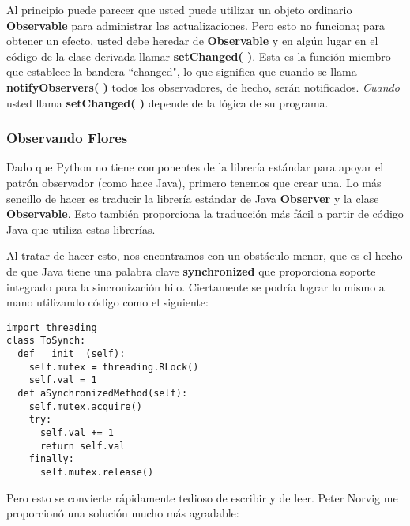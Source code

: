 Al principio puede parecer que usted puede utilizar un objeto ordinario \textbf{Observable} para administrar las actualizaciones. Pero esto no funciona; para obtener un efecto, usted debe heredar de \textbf{Observable} y en algún lugar en el código de la clase derivada llamar \textbf{setChanged( )}. Esta es la función miembro que establece la bandera “changed", lo que significa que cuando se llama \textbf{notifyObservers( )} todos los observadores, de hecho, serán notificados. \textit{Cuando} usted llama \textbf{setChanged( )} depende de la lógica de su programa.
 
\newpage

\subsubsection*{Observando Flores}
\label{subsubsec:of}


Dado que Python  no tiene componentes de la  librería estándar para apoyar el patrón observador (como hace Java), primero tenemos que crear una. Lo más sencillo de hacer es traducir la librería estándar de Java \textbf{Observer} y la clase \textbf{Observable}. Esto también proporciona la traducción más fácil a partir de código Java que utiliza estas librerías.    \newline

Al tratar de hacer esto, nos encontramos con un obstáculo menor, que es el hecho de que Java tiene una palabra clave \textbf{synchronized} que proporciona soporte integrado para la sincronización hilo. Ciertamente se podría lograr lo mismo a mano utilizando código como el siguiente:\newline

\begin{lstlisting} 
import threading  
class ToSynch: 
  def __init__(self): 
    self.mutex = threading.RLock() 
    self.val = 1 
  def aSynchronizedMethod(self): 
    self.mutex.acquire() 
    try: 
      self.val += 1 
      return self.val 
    finally: 
      self.mutex.release() 
\end{lstlisting}

 Pero esto se convierte rápidamente tedioso de escribir y de leer.  Peter Norvig me proporcionó una solución mucho más agradable:     \newline
 
